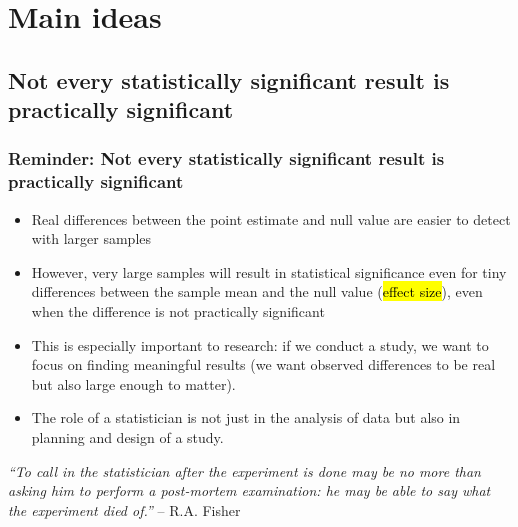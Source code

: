\documentclass[slidestop,compress,mathserif,12pt,t,professionalfonts,xcolor=table]{beamer}
\begin{document}

\section{Main ideas}

%


\subsection{Not every statistically significant result is practically significant}
\label{mi1}


\begin{frame}
\frametitle{Reminder: Not every statistically significant result is practically significant}

\begin{itemize}

\item Real differences between the point estimate and null value are easier to detect with larger samples

\item However, very large samples will result in statistical significance even for tiny differences between the 
sample mean and the null value (\hl{effect size}), even when the difference is not practically significant

\item This is especially important to research: if we conduct a study, we want to focus on finding meaningful 
results (we want observed differences to be real but also large enough to matter).

\item The role of a statistician is not just in the analysis of data but also in planning and design of a study.

\end{itemize}

\begin{center}
{\footnotesize \textit{``To call in the statistician after the experiment is done may be no more than asking him 
to perform a post-mortem examination: he may be able to say what the experiment died of.''} -- R.A. Fisher}
\end{center}

\end{frame}
\end{document}
